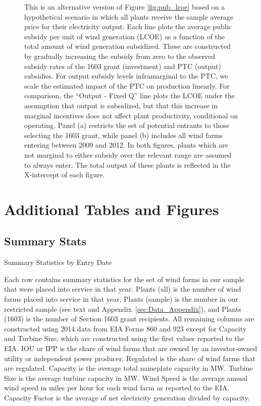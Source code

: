 \documentclass[12pt]{article}
\begin{document}
\begin{figure}[htb]
\begin{center}
  \end{center}
  \vspace{-15pt}
  \footnotesize
  This is an alternative version of Figure \ref{fig:pub_lcoe} based on a hypothetical scenario in which all plants receive the sample average price for their electricity output. Each line plots the average public subsidy per unit of wind generation (LCOE) as a function of the total amount of wind generation subsidized. These are constructed by gradually increasing the subsidy from zero to the observed subsidy rates of the 1603 grant (investment) and PTC (output) subsidies. For output subsidy levels inframarginal to the PTC, we scale the estimated impact of the PTC on production linearly. For comparison, the ``Output - Fixed Q'' line plots the LCOE under the assumption that output is subsidized, but that this increase in marginal incentives does not affect plant productivity, conditional on operating. Panel (a) restricts the set of potential entrants to those selecting the 1603 grant, while panel (b) includes all wind farms entering between 2009 and 2012. In both figures, plants which are not marginal to either subsidy over the relevant range are assumed to always enter. The total output of these plants is reflected in the X-intercept of each figure. 
\end{figure}



\clearpage
\section{Additional Tables and Figures}

\subsection{Summary Stats}

\begin{table}[H]
\caption{Summary Statistics by Entry Date \label{tab:Summary-Statistics}}
\vspace{-15pt}

\footnotesize
Each row contains summary statistics for the set of wind farms in our sample that were placed into service in that year. Plants (all) is the number of wind farms placed into service in that year, Plants (sample) is the number in our restricted sample (see text and Appendix~\ref{sec:Data_Appendix}), and Plants (1603) is the number of Section 1603 grant recipients. All remaining columns are constructed using 2014 data from EIA Forms 860 and 923 except for Capacity and Turbine Size, which are constructed using the first values reported to the EIA. IOU or IPP is the share of wind farms that are owned by an investor-owned utility or independent power producer. Regulated is the share of wind farms that are regulated. Capacity is the average total nameplate capacity in MW. Turbine Size is the average turbine capacity in MW. Wind Speed is the average annual wind speed in miles per hour for each wind farm as reported to the EIA. Capacity Factor is the average of net electricity generation divided by capacity.
\end{table}
\end{document}
